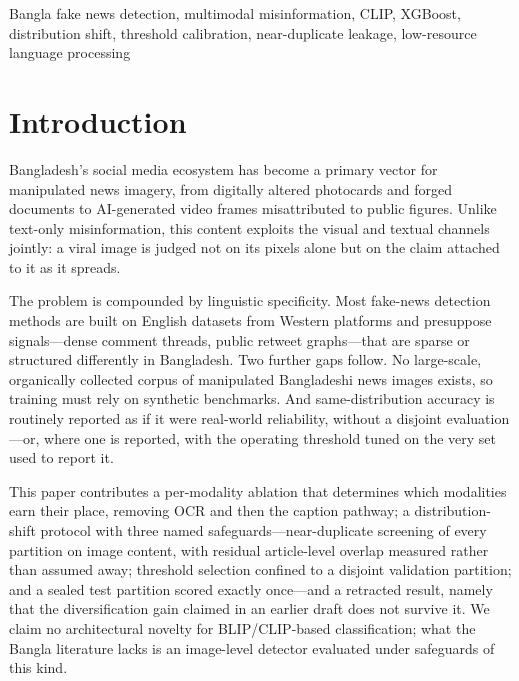 \documentclass[conference,a4paper]{IEEEtran}
\begin{document}
\begin{IEEEkeywords}
Bangla fake news detection, multimodal misinformation, CLIP, XGBoost,
distribution shift, threshold calibration, near-duplicate leakage,
low-resource language processing
\end{IEEEkeywords}

\section{Introduction}

Bangladesh's social media ecosystem has become a primary vector for
manipulated news imagery, from digitally altered photocards and forged
documents to AI-generated video frames misattributed to public figures. Unlike
text-only misinformation, this content exploits the visual and textual channels
jointly: a viral image is judged not on its pixels alone but on the claim
attached to it as it spreads.

The problem is compounded by linguistic specificity. Most fake-news detection
methods are built on English datasets from Western platforms and presuppose
signals---dense comment threads, public retweet graphs---that are sparse or
structured differently in Bangladesh. Two further gaps follow. No large-scale,
organically collected corpus of manipulated Bangladeshi news images exists, so
training must rely on synthetic benchmarks. And same-distribution accuracy is
routinely reported as if it were real-world reliability, without a disjoint
evaluation---or, where one is reported, with the operating threshold tuned on
the very set used to report it.

This paper contributes a per-modality ablation that determines which
modalities earn their place, removing OCR and then the caption pathway; a
distribution-shift protocol with three named safeguards---near-duplicate
screening of every partition on image content, with residual article-level
overlap measured rather than assumed away; threshold selection confined to a
disjoint validation partition; and a sealed test partition scored exactly
once---and a retracted result, namely that the diversification gain claimed in
an earlier draft does not survive it. We claim no architectural novelty for
BLIP/CLIP-based classification; what the Bangla literature lacks is an
image-level detector evaluated under safeguards of this kind.

\end{document}
